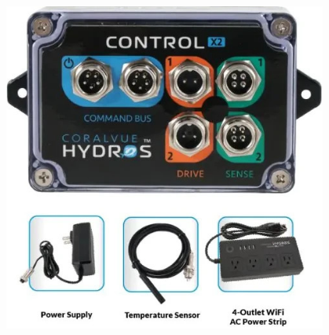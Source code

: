 \documentclass[%
  12pt,       				%
	t,                  %
	aspectratio=1610,   %
	unicode,						%
]{beamer}				    	%
\begin{document}
\begin{frame}[fragile]
\begin{columns}[T]
\begin{column}{0.5\textwidth}
		\end{column}
		\begin{column}{0.5\textwidth}		%
			\begin{figure}%
				\centering
				\vspace{-0.5cm}	              %
				\includegraphics[width=\columnwidth]{obrazky/prezentace/hydros-x2-starter-pack.jpg}
			\end{figure}
		\end{column}
	\end{columns}											%
\end{frame}
\end{document}
